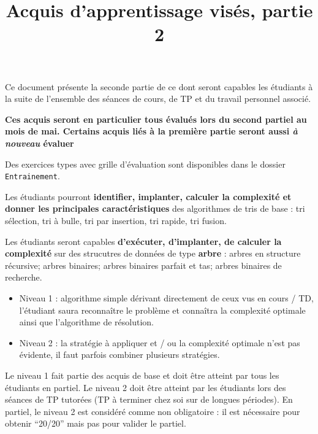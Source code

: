 \documentclass{../cours}
\title{Acquis d'apprentissage visés, partie 2}
\begin{document}
\maketitle

Ce document présente la seconde partie de ce dont seront capables les étudiants à la suite de l'ensemble des séances de cours, de TP et du travail personnel associé.

\textbf{Ces acquis seront en particulier tous évalués lors du second partiel au mois de mai. Certains acquis liés à la première partie seront aussi \emph{à nouveau} évaluer}

Des exercices types avec grille d'évaluation sont disponibles dans le dossier \texttt{Entrainement}.

\setcounter{aav}{6}

\begin{aav}
Les étudiants pourront \textbf{identifier, implanter, calculer la complexité et donner les principales caractéristiques} des algorithmes de tris de base : tri sélection, tri à bulle, tri par insertion, tri rapide, tri fusion.
\end{aav}

\begin{aav}
Les étudiants seront capables \textbf{d'exécuter, d'implanter, de calculer la complexité} sur des strucutres de données de type \textbf{arbre} :
arbres en structure récursive;
arbres binaires;
arbres binaires parfait et tas;
arbres binaires de recherche.

\begin{itemize}
\item Niveau 1 : algorithme simple dérivant directement de ceux vus en cours / TD, l'étudiant saura reconnaître le problème et connaîtra la complexité optimale ainsi que l'algorithme de résolution.
\item Niveau 2 : la stratégie à appliquer et / ou la complexité optimale n'est pas évidente, il faut parfois combiner plusieurs stratégies. 
\end{itemize}

Le niveau 1 fait partie des acquis de base et doit être atteint par tous les étudiants en partiel. Le niveau 2 doit être atteint par les étudiants lors des séances de TP tutorées (TP à terminer chez soi sur de longues périodes). En partiel, le niveau 2 est considéré comme non obligatoire : il est nécessaire pour obtenir ``20/20'' mais pas pour valider le partiel.
\end{aav}
\end{document}
